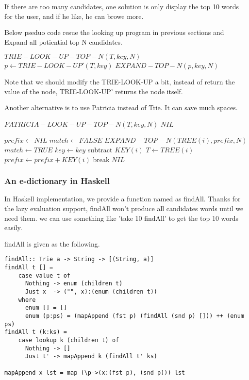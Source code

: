 \documentclass{article}
\begin{document}
If there are too many candidates, one solution is only display the top 10
words for the user, and if he like, he can browe more.

Below pseduo code resue the looking up program in previous sections and
Expand all potiential top N candidates.

\begin{algorithmic}
\STATE $TRIE-LOOK-UP-TOP-N(T, key, N)$
  \STATE $p \leftarrow TRIE-LOOK-UP'(T, key)$
  \RETURN $EXPAND-TOP-N(p, key, N)$
\end{algorithmic}

Note that we should modify the TRIE-LOOK-UP a bit, instead of return
the value of the node, TRIE-LOOK-UP' returns the node itself.

Another alternative is to use Patricia instead of Trie. It can save much
spaces.

\begin{algorithmic}
\STATE $PATRICIA-LOOK-UP-TOP-N(T, key, N)$
     \RETURN $NIL$ \ENDIF

  \STATE $prefix \leftarrow NIL$
  \REPEAT
    \STATE $match \leftarrow FALSE$
        \RETURN $EXPAND-TOP-N(TREE(i), prefix, N)$
      \ENDIF
        \STATE $match \leftarrow TRUE$
        \STATE $key \leftarrow key$ subtract $KEY(i)$
        \STATE $T \leftarrow TREE(i)$
        \STATE $prefix \leftarrow prefix + KEY(i)$
        \STATE break
      \ENDIF
    \ENDFOR
  \RETURN $NIL$
\end{algorithmic}

\subsubsection*{An e-dictionary in Haskell}
In Haskell implementation, we provide a function named as findAll.
Thanks for the lazy evaluation support, findAll won't produce all candidates
words until we need them. we can use something like 'take 10 findAll'
to get the top 10 words easily.

findAll is given as the following.

\lstset{language=Haskell}
\begin{lstlisting}
findAll:: Trie a -> String -> [(String, a)]
findAll t [] = 
    case value t of
      Nothing -> enum (children t) 
      Just x  -> ("", x):(enum (children t))
    where
      enum [] = []
      enum (p:ps) = (mapAppend (fst p) (findAll (snd p) [])) ++ (enum ps)
findAll t (k:ks) = 
    case lookup k (children t) of
      Nothing -> []
      Just t' -> mapAppend k (findAll t' ks)

mapAppend x lst = map (\p->(x:(fst p), (snd p))) lst
\end{lstlisting}
\end{document}
